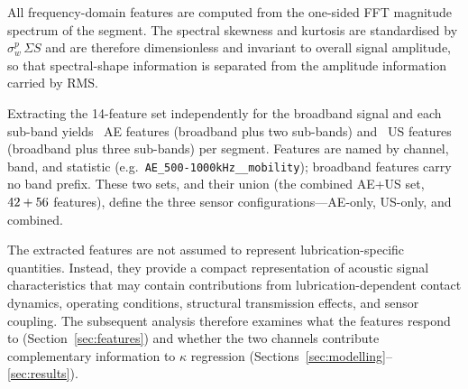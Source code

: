All frequency-domain features are computed from the one-sided FFT magnitude spectrum of the segment. The spectral skewness and kurtosis are standardised by
$\sigma_w^p\,\Sigma S$ and are therefore dimensionless and invariant to overall signal amplitude, so that spectral-shape information is separated from the amplitude
information carried by RMS.

Extracting the 14-feature set independently for the broadband signal and each sub-band yields \resNcandAe~AE features (broadband plus two sub-bands) and \resNcandUs~US features (broadband plus three sub-bands) per segment. Features are named by channel, band, and statistic (e.g.\ \texttt{AE\_500-1000kHz\_\_mobility}); broadband features carry no band prefix. These two sets, and their union (the combined AE+US set, $42 + 56$ features), define the three sensor configurations---AE-only, US-only, and combined.

The extracted features are not assumed to represent lubrication-specific quantities. Instead, they provide a compact representation of acoustic signal characteristics that may contain contributions from lubrication-dependent contact dynamics, operating conditions, structural transmission effects, and sensor coupling. The subsequent analysis therefore examines what the features respond to (Section~\ref{sec:features}) and whether the two channels contribute complementary information to $\kappa$ regression (Sections~\ref{sec:modelling}--\ref{sec:results}).